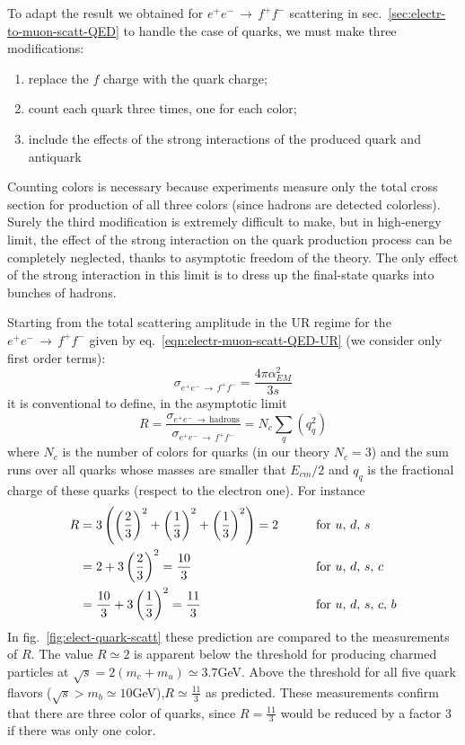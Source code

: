 \documentclass[TheoreticalPhy_ModB.tex]{subfiles}
\begin{document}
To adapt the result we obtained for $e^+e^-\,\rightarrow\,f^+f^-$ scattering in sec.~\ref{sec:electr-to-muon-scatt-QED} to handle the case of quarks, we must make three modifications:
\begin{enumerate}
\item replace the $f$ charge with the quark charge;
\item count each quark three times, one for each color;
\item include the effects of the strong interactions of the produced quark and antiquark
\end{enumerate}
Counting colors is necessary because experiments measure only the total cross section for production of all three colors (since hadrons are detected colorless). Surely the third modification is extremely difficult to make, but in high-energy limit, the effect of the strong interaction on the quark production process can be completely neglected, thanks to asymptotic freedom of the theory. The only effect of the strong interaction in this limit is to dress up the final-state quarks into bunches of hadrons. 

Starting from the total scattering amplitude in the UR regime for the $e^+e^-\,\rightarrow\,f^+f^-$ given by eq.~\eqref{eqn:electr-muon-scatt-QED-UR} (we consider only first order terms):
\[ \sigma_{e^+e^-\,\rightarrow\,f^+f^-} = \frac{4 \pi \alpha_{EM}^2}{3s}
\]
it is conventional to define, in the asymptotic limit
\[R=\frac{\sigma_{e^+e^-\,\rightarrow\,\text{hadrons}}}{\sigma_{e^+e^-\,\rightarrow\,f^+f^-}}=N_c\sum_q(q_q^2)\]
where $N_c$ is the number of colors for quarks (in our theory $N_c=3$) and the sum runs over all quarks whose masses are smaller that $E_{cm}/2$ and $q_q$ is the fractional charge of these quarks (respect to the electron one). 
For instance
\begin{alignat*}{3}
R&=3\left(\left(\frac23\right)^2+\left(\frac13\right)^2+\left(\frac13\right)^2\right)=2	\qquad&&\text{for }u,\,d,\,s\\
&=2+3\left(\frac23\right)^2=\frac{10}3	&&\text{for }u,\,d,\,s,\,c\\
&=\frac{10}3+3\left(\frac13\right)^2=\frac{11}3	&&\text{for }u,\,d,\,s,\,c,\,b
\end{alignat*}
In fig.~\ref{fig:elect-quark-scatt} these prediction are compared to the measurements of $R$.  The value $R\simeq 2$ is apparent below the threshold for producing charmed particles at $\sqrt s=2(m_c+m_u)\simeq3.7$GeV. Above the threshold for all five quark flavors ($\sqrt s>m_b\simeq10$GeV),$R\simeq\frac{11}3$ as predicted. These measurements confirm that there are three color of quarks, since $R=\frac{11}3$ would be reduced by a factor 3 if there was only one color. 
\end{document}

